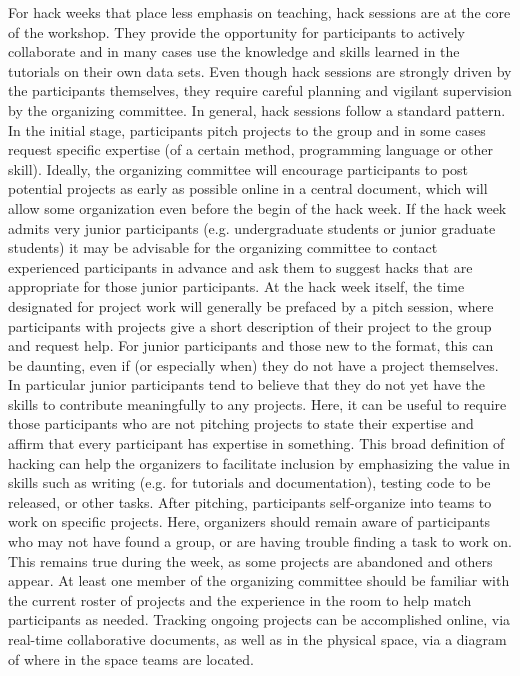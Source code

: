 \documentclass{aastex62}
\begin{document}
For hack weeks that place less emphasis on teaching, hack sessions are at the core of the workshop. They provide the opportunity for participants to actively collaborate and in many cases use the knowledge and skills learned in the tutorials on their own data sets. Even though hack sessions are strongly driven by the participants themselves, they require careful planning and vigilant supervision by the organizing committee. In general, hack sessions follow a standard pattern. In the initial stage, participants pitch projects to the group and in some cases request specific expertise (of a certain method, programming language or other skill). Ideally, the organizing committee will encourage participants to post potential projects as early as possible online in a central document, which will allow some organization even before the begin of the hack week. If the hack week admits very junior participants (e.g. undergraduate students or junior graduate students) it may be advisable for the organizing committee to contact experienced participants in advance and ask them to suggest hacks that are appropriate for those junior participants.
At the hack week itself, the time designated for project work will generally be prefaced by a pitch session, where participants with projects give a short description of their project to the group and request help. For junior participants and those new to the format, this can be daunting, even if (or especially when) they do not have a project themselves. In particular junior participants tend to believe that they do not yet have the skills to contribute meaningfully to any projects. Here, it can be useful to require those participants who are not pitching projects to state their expertise and affirm that every participant has expertise in something. This broad definition of hacking can help the organizers to facilitate inclusion by emphasizing the value in skills such as writing (e.g. for tutorials and documentation), testing code to be released, or other tasks. After pitching, participants self-organize into teams to work on specific projects. Here, organizers should remain aware of participants who may not have found a group, or are having trouble finding a task to work on. This remains true during the week, as some projects are abandoned and others appear. At least one member of the organizing committee should be familiar with the current roster of projects and the experience in the room to help match participants as needed. Tracking ongoing projects can be accomplished online, via real-time collaborative documents, as well as in the physical space, via a diagram of where in the space teams are located.
\end{document}
